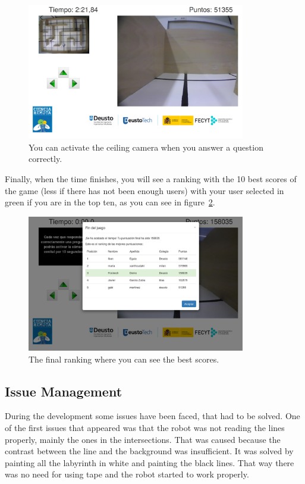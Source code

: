 \begin{figure}[!htbp]
	\centering
	\includegraphics[width=0.85\textwidth]{fig/manuals/trivial/romie-ceiling}
	\caption{You can activate the ceiling camera when you answer a question correctly.}
	\label{fig:man:romie_ceiling}
\end{figure}

Finally, when the time finishes, you will see a ranking with the 10 best scores of the game (less if
there has not been enough users) with your user selected in green if you are in the top ten, as you
can see in figure~\ref{fig:man:romie_ranking}.

\begin{figure}[!htbp]
	\centering
	\includegraphics[width=0.85\textwidth]{fig/manuals/trivial/romie-ranking}
	\caption{The final ranking where you can see the best scores.}
	\label{fig:man:romie_ranking}
\end{figure}

\subsection{Issue Management}

During the development some issues have been faced, that had to be solved. One of the first issues
that appeared was that the robot was not reading the lines properly, mainly the ones in the
intersections. That was caused because the contrast between the line and the background was
insufficient. It was solved by painting all the labyrinth in white and painting the black lines.
That way there was no need for using tape and the robot started to work properly.

